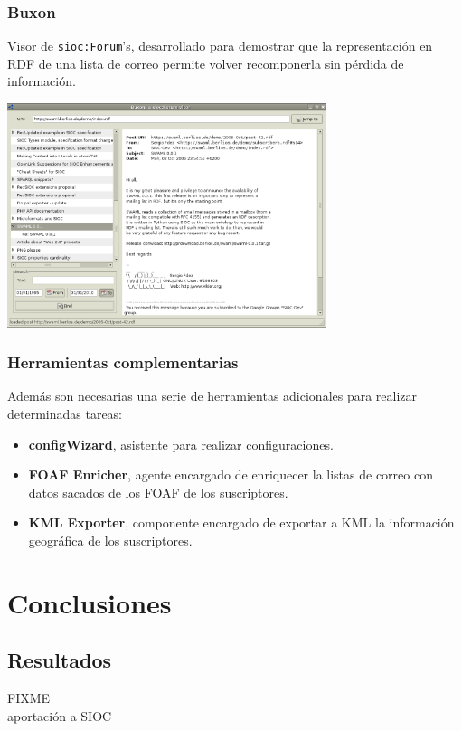 \documentclass[spanish,notes=hide]{beamer}
\begin{document}
\frame
{
  \frametitle{Buxon}

  Visor de \texttt{sioc:Forum}'s, desarrollado para demostrar que la representación en RDF de una lista de correo
  permite volver recomponerla sin pérdida de información.

  \begin{center}
	\includegraphics[width=0.7\textwidth]{images/buxon.png}
  \end{center}
}
\frame
{
  \frametitle{Herramientas complementarias}

  Además son necesarias una serie de herramientas adicionales para realizar determinadas tareas:

  \begin{itemize}
   \item \textbf{configWizard}, asistente para realizar configuraciones.
   \item \textbf{FOAF Enricher}, agente encargado de enriquecer la listas de correo con datos sacados de los FOAF de los suscriptores.
   \item \textbf{KML Exporter}, componente encargado de exportar a KML la información geográfica de los suscriptores.
  \end{itemize}
}

\section{Conclusiones}
\subsection{Resultados}
\frame
{
  FIXME\\
  aportación a SIOC
}
\end{document}
